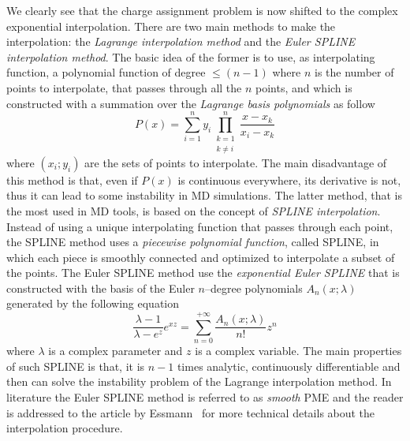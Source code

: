 We clearly see that the charge assignment problem is now shifted to the complex exponential interpolation. There are two main methods to make the interpolation: the \textit{Lagrange interpolation method} and the \textit{Euler SPLINE interpolation method}. The basic idea of the former is to use, as interpolating function, a polynomial function of degree $ \le (n-1)$ where $n$ is the number of points to interpolate, that passes through all the $n$ points, and which is constructed with a summation over the \textit{Lagrange basis polynomials} as follow
\begin{equation*}
	P(x) = \sum_{i=1}^n y_i \prod_{\substack{k=1\\k\ne i}}^n \frac{x-x_k}{x_i - x_k}
\end{equation*}
where $(x_i;y_i)$ are the sets of points to interpolate. The main disadvantage of this method is that, even if $P(x)$ is continuous everywhere, its derivative is not, thus it can lead to some instability in \ac{MD} simulations. The latter method, that is the most used in \ac{MD} tools, is based on the concept of \textit{SPLINE interpolation}. Instead of using a unique interpolating function that passes through each point, the SPLINE method uses a \textit{piecewise polynomial function}, called SPLINE, in which each piece is smoothly connected and optimized to interpolate a subset of the points. The Euler SPLINE method use the \textit{exponential Euler SPLINE} that is constructed with the basis of the Euler $n$--degree polynomials $A_n(x;\lambda)$ generated by the following equation
\begin{equation*}
	\frac{\lambda - 1}{\lambda - e^z}e^{xz} = \sum_{n=0}^{+\infty} \frac{A_n(x;\lambda)}{n!}z^n
\end{equation*}
where $\lambda$ is a complex parameter and $z$ is a complex variable. The main properties of such SPLINE is that, it is $n-1$ times analytic, continuously differentiable and then can solve the instability problem of the Lagrange interpolation method. In literature the Euler SPLINE method is referred to as \textit{smooth} \acl{PME} and the reader is addressed to the article by Essmann \etal\, \cite{EssmannSPME} for more technical details about the interpolation procedure.

